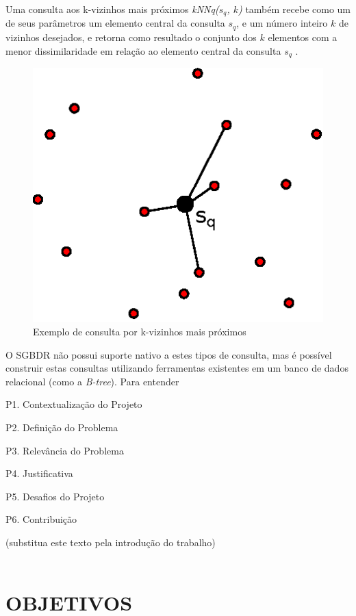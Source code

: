 Uma consulta aos k-vizinhos mais próximos \textit{kNNq($s_q$, $k$)} também recebe como um de seus parâmetros um elemento central da consulta $s_q$, e um número inteiro $k$ de vizinhos desejados, e retorna
como resultado o conjunto dos $k$ elementos com a menor dissimilaridade em relação ao elemento central da consulta $s_q$ \cite{POLA2010}.

\begin{figure}[ht]
\centering
\captionsetup{width=0.50\textwidth, font=footnotesize, textfont=bf}
\includegraphics[width=.3\textwidth]{dados/figuras/knnq.eps}
\caption{Exemplo de consulta por k-vizinhos mais próximos}
\label{fig:exemploknnq}
\end{figure}

O SGBDR não possui suporte nativo a estes tipos de consulta, mas é possível construir estas consultas utilizando ferramentas existentes em um banco de dados relacional (como a \textit{B-tree}).
Para entender 




P1. Contextualização do Projeto

P2. Definição do Problema

P3. Relevância do Problema

P4. Justificativa

P5. Desafios do Projeto

P6. Contribuição

(substitua este texto pela introdução do trabalho) \\ \\

{\let\clearpage\relax \chapter{OBJETIVOS}}
\label{chap:objetivos}

